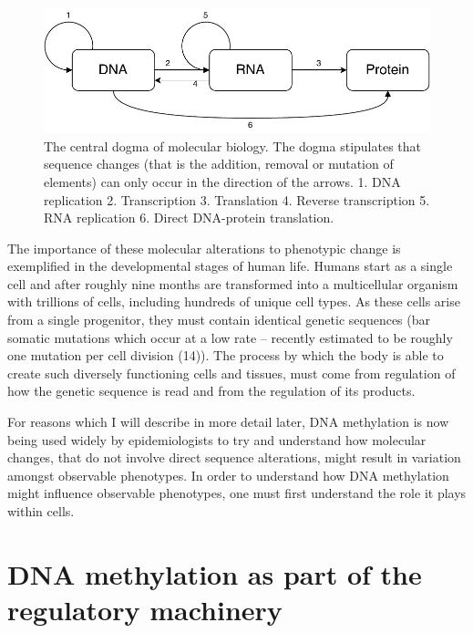 \documentclass[11pt,oneside]{bristolthesis}
\begin{document}
\begin{figure}

{\centering \includegraphics[width=1\linewidth]{figure/01-introduction/central-dogma} 

}

\caption{The central dogma of molecular biology. The dogma stipulates that sequence changes (that is the addition, removal or mutation of elements) can only occur in the direction of the arrows. 1. DNA replication 2. Transcription 3. Translation 4. Reverse transcription 5. RNA replication 6. Direct DNA-protein translation.}\label{fig:central-dogma}
\end{figure}
The importance of these molecular alterations to phenotypic change is exemplified in the developmental stages of human life. Humans start as a single cell and after roughly nine months are transformed into a multicellular organism with trillions of cells, including hundreds of unique cell types. As these cells arise from a single progenitor, they must contain identical genetic sequences (bar somatic mutations which occur at a low rate -- recently estimated to be roughly one mutation per cell division (14)). The process by which the body is able to create such diversely functioning cells and tissues, must come from regulation of how the genetic sequence is read and from the regulation of its products.

For reasons which I will describe in more detail later, DNA methylation is now being used widely by epidemiologists to try and understand how molecular changes, that do not involve direct sequence alterations, might result in variation amongst observable phenotypes. In order to understand how DNA methylation might influence observable phenotypes, one must first understand the role it plays within cells.

\hypertarget{dnam-as-part-of-regulation}{%
\section{DNA methylation as part of the regulatory machinery}\label{dnam-as-part-of-regulation}}
\end{document}
